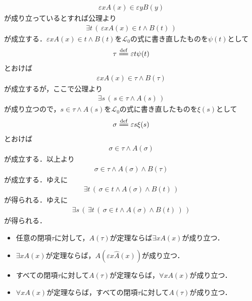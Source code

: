 \begin{itemize}
\begin{align}
				\varepsilon x A(x) \in \varepsilon y B(y)
			\end{align}
			が成り立っているとすれば公理より
			\begin{align}
				\exists t\, \left(\, \varepsilon x A(x) \in t \wedge B(t)\, \right)
			\end{align}
			が成立する．$\varepsilon x A(x) \in t \wedge B(t)$を$\mathcal{L}_{0}$の式に書き直したものを$\psi(t)$として
			\begin{align}
				\tau \defeq \varepsilon t \psi(t)
			\end{align}
			とおけば
			\begin{align}
				\varepsilon x A(x) \in \tau \wedge B(\tau)
			\end{align}
			が成立するが，ここで公理より
			\begin{align}
				\exists s\, \left(\, s \in \tau \wedge A(s)\, \right)
			\end{align}
			が成り立つので，$s \in \tau \wedge A(s)$を$\mathcal{L}_{0}$の式に書き直したものを$\xi(s)$として
			\begin{align}
				\sigma \defeq \varepsilon s \xi(s)
			\end{align}
			とおけば
			\begin{align}
				\sigma \in \tau \wedge A(\sigma)
			\end{align}
			が成立する．以上より
			\begin{align}
				\sigma \in \tau \wedge A(\sigma) \wedge B(\tau)
			\end{align}
			が成立する．ゆえに
			\begin{align}
				\exists t\, \left(\, \sigma \in t \wedge A(\sigma) \wedge B(t)\, \right)
			\end{align}
			が得られる．ゆえに
			\begin{align}
				\exists s\, \left(\, \exists t\, \left(\, \sigma \in t \wedge A(\sigma) \wedge B(t)\, \right)\, \right)
			\end{align}
			が得られる．
	\end{itemize}
	
	\begin{screen}
		\begin{logicalaxm}\mbox{}
			\begin{itemize}
				\item 任意の閉項$\tau$に対して，$A(\tau)$が定理ならば$\exists x A(x)$が成り立つ．
				\item $\exists x A(x)$が定理ならば，$A(\varepsilon x \hat{A}(x))$が成り立つ．
				\item すべての閉項$\tau$に対して$A(\tau)$が定理ならば，$\forall x A(x)$が成り立つ．
				\item $\forall x A(x)$が定理ならば，すべての閉項$\tau$に対して$A(\tau)$が成り立つ．
			\end{itemize}
		\end{logicalaxm}
	\end{screen}
	
